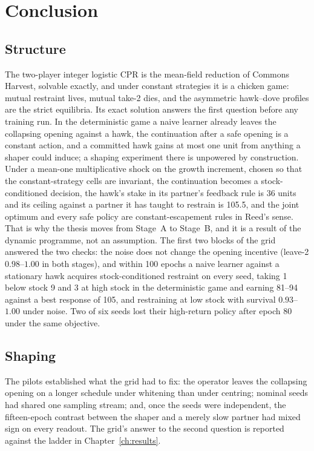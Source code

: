 \chapter{Conclusion}
\label{ch:conc}


\section{Structure}

The two-player integer logistic CPR is the mean-field reduction of
Commons Harvest, solvable exactly, and under constant strategies it is a
chicken game: mutual restraint lives, mutual take-2 dies, and the
asymmetric hawk--dove profiles are the strict equilibria.
Its exact solution answers the first question before any training run.
In the deterministic game a naive learner already leaves the collapsing
opening against a hawk, the continuation after a safe opening is a
constant action, and a committed hawk gains at most one unit from
anything a shaper could induce; a shaping experiment there is unpowered
by construction.
Under a mean-one multiplicative shock on the growth increment, chosen so
that the constant-strategy cells are invariant, the continuation becomes
a stock-conditioned decision, the hawk's stake in its partner's feedback
rule is 36 units and its ceiling against a partner it has taught to
restrain is 105.5, and the joint optimum and every safe policy are
constant-escapement rules in Reed's sense.
That is why the thesis moves from Stage~A to Stage~B, and it is a result
of the dynamic programme, not an assumption.
The first two blocks of the grid answered the two checks: the noise does
not change the opening incentive (leave-2 \(0.98\)--\(1.00\) in both
stages), and within 100 epochs a naive learner against a stationary hawk
acquires stock-conditioned restraint on every seed, taking 1 below stock
9 and 3 at high stock in the deterministic game and earning 81--94
against a best response of 105, and restraining at low stock with
survival \(0.93\)--\(1.00\) under noise.
Two of six seeds lost their high-return policy after epoch 80 under the
same objective.

\section{Shaping}

The pilots established what the grid had to fix: the operator leaves the
collapsing opening on a longer schedule under whitening than under
centring; nominal seeds had shared one sampling stream; and, once the
seeds were independent, the fifteen-epoch contrast between the shaper and
a merely slow partner had mixed sign on every readout.
The grid's answer to the second question is reported against the ladder
in Chapter~\ref{ch:results}.

